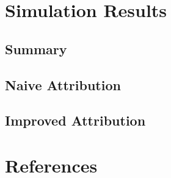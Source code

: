\documentclass{article}
\begin{document}
\newpage

\section{Simulation Results}

\subsection{Summary}

\subsection{Naive Attribution}

\subsection{Improved Attribution}

\section{References}



\end{document}
